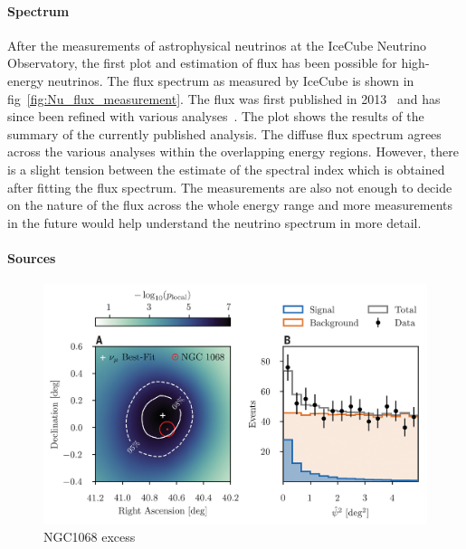   \paragraph*{Spectrum}
  \label{subsubsec:Nuspectrum}
  After the measurements of astrophysical neutrinos at the IceCube Neutrino Observatory, the first plot and estimation of flux has been possible for high-energy neutrinos. The flux spectrum as measured by IceCube is shown in fig~\ref{fig:Nu_flux_measurement}. The flux was first published in 2013~\cite{Aartsen_2014_first_flux} and has since been refined with various analyses~\cite{PhysRevD.110.022001}. The plot shows the results of the summary of the currently published analysis. The diffuse flux spectrum agrees across the various analyses within the overlapping energy regions. However, there is a slight tension between the estimate of the spectral index which is obtained after fitting the flux spectrum. The measurements are also not enough to decide on the nature of the flux across the whole energy range and more measurements in the future would help understand the neutrino spectrum in more detail. 

  \paragraph*{Sources}
  \label{subsubsec:Nusources}
  \begin{figure}[t!]
    \centering
    \includegraphics[width=14.5cm]{thesis_figures/CRnNu/science-abg3395-f2.jpg}
    \caption{NGC1068 excess~\cite{Icecube_2022}}
    \label{fig:NGC1068_excess}
  \end{figure}

